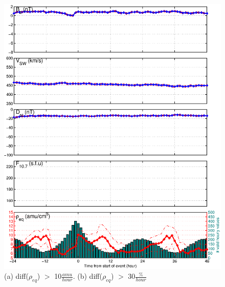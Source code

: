 \documentclass[10pt,twocolumn]{article}
\begin{document}
\begin{figure}[tp!]
\includegraphics[scale=0.40]{paperfigures/stormavs-diffden-30percent.eps}
\caption{(a) diff($\rho_{eq}$) $>$ 10$\frac{amu}{hour}$. (b) diff($\rho_{eq}$) $>$ 30$\frac{\%}{hour}$}
\label{rhochange}
\end{figure}
\clearpage
\end{document}
